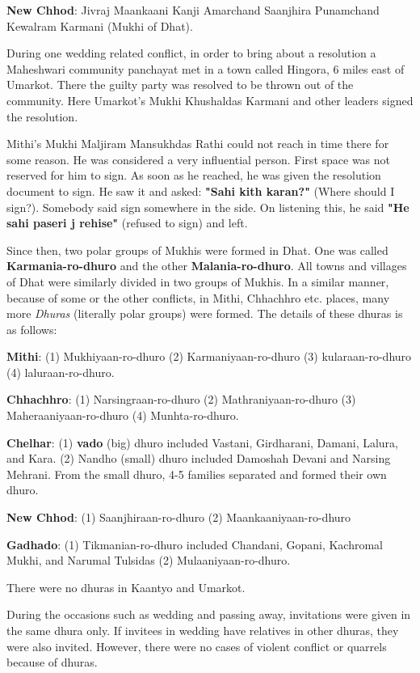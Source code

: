 \textbf{New Chhod}: Jivraj Maankaani
                    Kanji Amarchand Saanjhira
                    Punamchand Kewalram Karmani (Mukhi of Dhat).

During one wedding related conflict, in order to bring about a resolution a
Maheshwari community panchayat met in a town called Hingora, 6 miles east of
Umarkot. There the guilty party was resolved to be thrown out of the community.
Here Umarkot's Mukhi Khushaldas Karmani and other leaders signed the
resolution.

Mithi's Mukhi Maljiram Mansukhdas Rathi could not reach in time there for some
reason. He was considered a very influential person. First space was not
reserved for him to sign. As soon as he reached, he was given the resolution
document to sign. He saw it and asked: \textbf{"Sahi kith karan?"} (Where
should I sign?). Somebody said sign somewhere in the side. On listening this,
he said \textbf{"He sahi paseri j rehise"} (refused to sign) and left.

Since then, two polar groups of Mukhis were formed in Dhat. One was called
\textbf{Karmania-ro-dhuro} and the other \textbf{Malania-ro-dhuro}. All towns
and villages of Dhat were similarly divided in two groups of Mukhis. In a
similar manner, because of some or the other conflicts, in Mithi, Chhachhro
etc. places, many more \textit{Dhuras} (literally polar groups) were formed.
The details of these dhuras is as follows:

\textbf{Mithi}: (1) Mukhiyaan-ro-dhuro (2) Karmaniyaan-ro-dhuro (3)
kularaan-ro-dhuro (4) laluraan-ro-dhuro.

\textbf{Chhachhro}: (1) Narsingraan-ro-dhuro (2) Mathraniyaan-ro-dhuro (3)
Maheraaniyaan-ro-dhuro (4) Munhta-ro-dhuro.

\textbf{Chelhar}: (1) \textbf{vado} (big) dhuro included Vastani, Girdharani, Damani,
Lalura, and Kara. (2) Nandho (small) dhuro included Damoshah Devani and Narsing
Mehrani. From the small dhuro, 4-5 families separated and formed their own
dhuro.

\textbf{New Chhod}: (1) Saanjhiraan-ro-dhuro (2) Maankaaniyaan-ro-dhuro

\textbf{Gadhado}: (1) Tikmanian-ro-dhuro included Chandani, Gopani, Kachromal
Mukhi, and Narumal Tulsidas (2) Mulaaniyaan-ro-dhuro.

There were no dhuras in Kaantyo and Umarkot.

During the occasions such as wedding and passing away, invitations were given
in the same dhura only. If invitees in wedding have relatives in other dhuras,
they were also invited. However, there were no cases of violent conflict or
quarrels because of dhuras.
